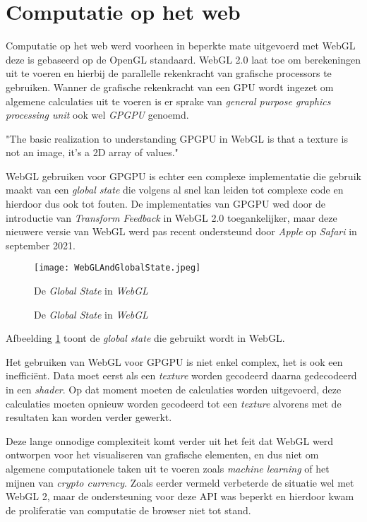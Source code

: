 \section{Computatie op het web}

Computatie op het web werd voorheen in beperkte mate uitgevoerd met WebGL deze is gebaseerd op de OpenGL standaard. WebGL 2.0 laat toe om berekeningen uit te voeren en hierbij de parallelle rekenkracht van grafische processors te gebruiken. Wanner de grafische rekenkracht van een GPU wordt ingezet om algemene calculaties uit te voeren is er sprake van \textit{general purpose graphics processing unit} ook wel \textit{GPGPU} genoemd.

\begin{displayquote}
    "The basic realization to understanding GPGPU in WebGL is that a texture is not an image, it's a 2D array of values." \autocite{Tavares2021}
\end{displayquote}

WebGL gebruiken voor GPGPU is echter een complexe implementatie die gebruik maakt van een \textit{global state} die volgens \textcite{Surma2022} al snel kan leiden tot complexe code en hierdoor dus ook tot fouten. De implementaties van GPGPU wed door de introductie van \textit{Transform Feedback} in WebGL 2.0 toegankelijker, maar deze nieuwere versie van WebGL werd pas recent ondersteund door \textit{Apple} op \textit{Safari} in september 2021.

\begin{figure}
    \texttt{[image: WebGLAndGlobalState.jpeg]}
    \caption{De \textit{Global State} in \textit{WebGL}}{De \textit{Global State} in \textit{WebGL}}
    \label{fig:WebGL Global State}
\end{figure}

\bigbreak{}

Afbeelding \ref{fig:WebGL Global State} toont de \textit{global state} die gebruikt wordt in WebGL.

\bigbreak{}

Het gebruiken van WebGL voor GPGPU is niet enkel complex, het is ook een inefficiënt. Data moet eerst als een \textit{texture} worden gecodeerd daarna gedecodeerd in een \textit{shader}. Op dat moment moeten de calculaties worden uitgevoerd, deze calculaties moeten opnieuw worden gecodeerd tot een \textit{texture} alvorens met de resultaten kan worden verder gewerkt. \autocite{Surma2022}

\bigbreak{}

Deze lange onnodige complexiteit komt verder uit het feit dat WebGL werd ontworpen voor het visualiseren van grafische elementen, en dus niet om algemene computationele taken uit te voeren zoals \textit{machine learning} of het mijnen van \textit{crypto currency}. Zoals eerder vermeld verbeterde de situatie wel met WebGL 2, maar de ondersteuning voor deze API was beperkt en hierdoor kwam de proliferatie van computatie de browser niet tot stand.

